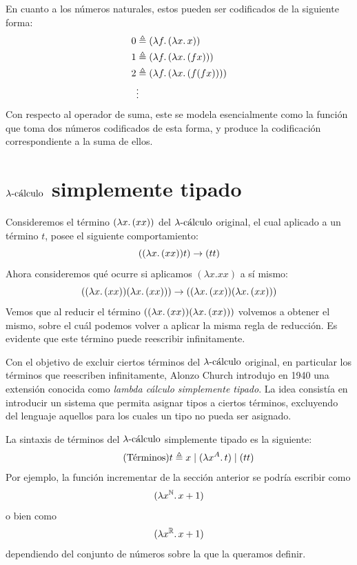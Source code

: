 En cuanto a los números naturales, estos pueden ser codificados de la siguiente forma:
\begin{equation*}
  \begin{split}
    0 & \triangleq \lcabstr{f}{\lcabstr{x}{x}} \\
    1 & \triangleq \lcabstr{f}{\lcabstr{x}{\lcapp{f}{x}}} \\
    2 & \triangleq \lcabstr{f}{\lcabstr{x}{\lcapp{f}{\lcapp{f}{x}}}} \\
    & \vdots
  \end{split}
\end{equation*}
Con respecto al operador de suma, este se modela esencialmente como la función que toma dos números codificados de esta forma, y produce la codificación correspondiente a la suma de ellos.

\section{\texorpdfstring{\( \lambdacalculus \)}{lambda calculus} simplemente tipado}

Consideremos el término \( \lcabstr{x}{\lcapp{x}{x}} \) del \( \lambdacalculus \) original, el cual aplicado a un término \( t \), posee el siguiente comportamiento:
\[
  \lcapp{\lcabstr{x}{\lcapp{x}{x}}}{t} \reducesto \lcapp{t}{t}
\]
Ahora consideremos qué ocurre si aplicamos \( (\lambda x . x x) \) a sí mismo:
\[
  \lcapp{\lcabstr{x}{\lcapp{x}{x}}}{\lcabstr{x}{\lcapp{x}{x}}} \reducesto \lcapp{\lcabstr{x}{\lcapp{x}{x}}}{\lcabstr{x}{\lcapp{x}{x}}}
\]
Vemos que al reducir el término \( \lcapp{\lcabstr{x}{\lcapp{x}{x}}}{\lcabstr{x}{\lcapp{x}{x}}} \) volvemos a obtener el mismo, sobre el cuál podemos volver a aplicar la misma regla de reducción. Es evidente que este término puede reescribir infinitamente.

Con el objetivo de excluir ciertos términos del \( \lambdacalculus \) original, en particular los términos que reescriben infinitamente, Alonzo Church introdujo en 1940 una extensión conocida como \textit{lambda cálculo simplemente tipado}. La idea consistía en introducir un sistema que permita asignar tipos a ciertos términos, excluyendo del lenguaje aquellos para los cuales un tipo no pueda ser asignado.

La sintaxis de términos del \( \lambdacalculus \) simplemente tipado es la siguiente:
\[
  \tag{Términos}
  t \triangleq x \mid \stlcabstr{x}{A}{t} \mid \stlcapp{t}{t}
\]
Por ejemplo, la función \textsf{incrementar} de la sección anterior se podría escribir como
\[ \stlcabstr{x}{\mathbb{N}}{x + 1} \]
o bien como
\[ \stlcabstr{x}{\mathbb{R}}{x + 1} \]
dependiendo del conjunto de números sobre la que la queramos definir.

